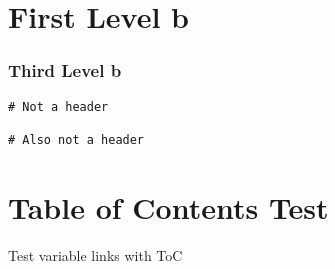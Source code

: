 \part{First Level b}
\label{firstlevelb}

\section{Third Level b}
\label{thirdlevelb}

\begin{verbatim}
# Not a header

# Also not a header 
\end{verbatim}

\part{Table of Contents Test}
\label{title}

Test variable links with ToC




